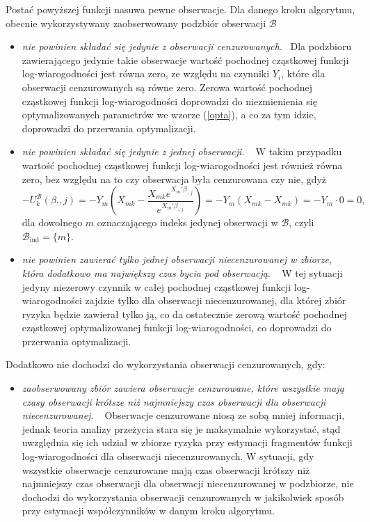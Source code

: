 Postać powyższej funkcji nasuwa pewne obserwacje. Dla danego kroku algorytmu, obecnie wykorzystywany zaobserwowany podzbiór obserwacji \(\mathcal{B}\)
\begin{itemize}
\item \textit{nie powinien składać się jedynie z obserwacji cenzurowanych}. \newline \ \newline Dla podzbioru zawierającego jedynie takie obserwacje wartość pochodnej cząstkowej funkcji log-wiarogodności jest równa zero, ze względu na czynniki $Y_i$, które dla obserwacji cenzurowanych są równe zero. Zerowa wartość pochodnej cząstkowej funkcji log-wiarogodności doprowadzi do niezmienienia się optymalizowanych parametrów we wzorze (\ref{opta}), a co za tym idzie, doprowadzi do przerwania optymalizacji.
\item \textit{nie powinien składać się jedynie z jednej obserwacji}. \newline \ \newline  
W takim przypadku wartość pochodnej cząstkowej funkcji log-wiarogodności jest również równa zero, bez względu na to czy obserwacja była cenzurowana czy nie, gdyż 
$$-U_{k}^{\mathcal{B}}(\beta{.,j})=-Y_m\left(X_{mk}-\dfrac{ X_{mk} e^{X_m'\beta_{.,j}}}{ e^{X_m'\beta_{.,j}}}\right) = -Y_m\left(X_{mk}-X_{mk}\right) = -Y_m \cdot 0 = 0,$$
dla dowolnego $m$ oznaczającego indeks jedynej obserwacji w $\mathcal{B}$, czyli $\mathcal{B}_{\text{ind}}=\{m\}$. 
\item \textit{nie powinien zawierać tylko jednej obserwacji niecenzurowanej w zbiorze, która dodatkowo ma największy czas bycia pod obserwacją}. \newline \ \newline 
W tej sytuacji jedyny niezerowy czynnik w całej pochodnej cząstkowej funkcji log-wiarogodności zajdzie tylko dla obserwacji niecenzurowanej, dla której zbiór ryzyka będzie zawierał tylko ją, co da ostatecznie zerową wartość pochodnej cząstkowej optymalizowanej funkcji log-wiarogodności, co doprowadzi do przerwania optymalizacji.
\end{itemize}

Dodatkowo nie dochodzi do wykorzystania obserwacji cenzurowanych, gdy:
\begin{itemize}
\item \textit{zaobserwowany zbiór zawiera obserwacje cenzurowane, które wszystkie mają czasy obserwacji krótsze niż najmniejszy czas obserwacji dla obserwacji niecenzurowanej}. \newline \ \newline 
Obserwacje cenzurowane niosą ze sobą mniej informacji, jednak teoria analizy przeżycia stara się je maksymalnie wykorzystać, stąd uwzględnia się ich udział w zbiorze ryzyka przy estymacji fragmentów funkcji log-wiarogodności dla obserwacji niecenzurowanych. W sytuacji, gdy wszystkie obserwacje cenzurowane mają czas obserwacji krótszy niż najmniejszy czas obserwacji dla obserwacji niecenzurowanej w podzbiorze, nie dochodzi do wykorzystania obserwacji cenzurowanych w jakikolwiek sposób przy estymacji współczynników w danym kroku algorytmu.
\end{itemize}

